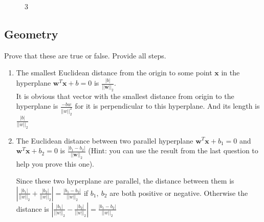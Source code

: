 \documentclass[a4paper]{article}
\theoremstyle{definition}
\newenvironment{soln}{
    \leavevmode\color{blue}\ignorespaces
}{}
\begin{document}
\begin{enumerate}
\begin{soln}
\begin{figure}[h!]
	   		\captionsetup{labelformat=empty}
	   		\caption{3}
	   	\end{figure}
	\end{soln}
\end{enumerate}




\subsection{Geometry}
Prove that these are true or false. Provide all steps.
\begin{enumerate}
\item 	The smallest Euclidean distance from the origin to some point $\mathbf{x}$ in the hyperplane $\mathbf{w}^T\mathbf{x} + b = 0$ is $\frac{|b|}{||\mathbf{w}||_2}$.\\
\begin{soln}  It is obvious that vector with the smallest distance from origin to the hyperplane is $\frac{-bw}{||w||_2^2}$ for it is perpendicular to this hyperplane. And its length is $\frac{|b|}{||w||_2}$ \end{soln}

\item 	The Euclidean distance between two parallel hyperplane $\mathbf{w}^T\mathbf{x} + b_1 = 0$ and $\mathbf{w}^T\mathbf{x} + b_2 = 0$ is $\frac{|b_1 - b_2|}{||\mathbf{w}||_2}$ (Hint: you can use the result from the last question to help you prove this one).

\begin{soln}  Since these two hyperplane are parallel, the distance between them is $|\frac{|b_1|}{||w||_2}+\frac{|b_2|}{||w||_2}|=\frac{|b_1-b_2|}{||w||_2}$ if $b_1,\ b_2$ are both positive or negative. Otherwise the distance is $|\frac{|b_1|}{||w||_2}-\frac{|b_2|}{||w||_2}|=\frac{|b_1-b_2|}{||w||_2}$\end{soln}

\end{enumerate}
\end{document}
